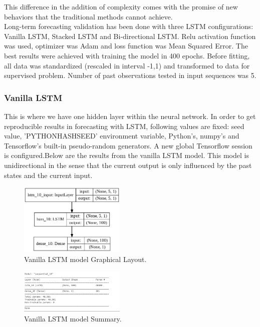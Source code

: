 \documentclass[12pt]{report}
\begin{document}
This difference in the addition of complexity comes with the promise of new behaviors that the traditional methods cannot achieve.\\
Long-term forecasting validation has been done with three LSTM configurations: Vanilla LSTM, Stacked LSTM and Bi-directional LSTM. Relu activation function was used, optimizer was Adam and loss function was Mean Squared Error. The best results were achieved with training the model in 400 epochs. Before fitting, all data was standardized (rescaled in interval -1,1) and transformed to data for supervised problem.
Number of past observations tested in input sequences was 5.

\subsubsection{Vanilla LSTM}
This is where we have one hidden layer within the neural network.
In order to get reproducible results in forecasting with LSTM, following values are fixed: seed value, 'PYTHONHASHSEED' environment variable, Python's, numpy's and Tensorflow's built-in pseudo-random generators. A new global Tensorflow session is configured.Below are the results from the vanilla LSTM model.
This model is unidirectional in the sense that the current output is only influenced by the past states and the current input.
\begin{figure}[H]%
  \begin {center}
  \includegraphics[width=0.45\textwidth]{dia.png}
  \caption{Vanilla LSTM model Graphical Layout.}
  \label{fig:ecg}
  \end {center}
\end{figure}

\begin{figure}[H]%
  \begin {center}
  \includegraphics[width=0.45\textwidth]{VanillaSummary.png}
  \caption{Vanilla LSTM model Summary.}
  \label{fig:ecg}
  \end {center}
\end{figure}
  
\end{document}
